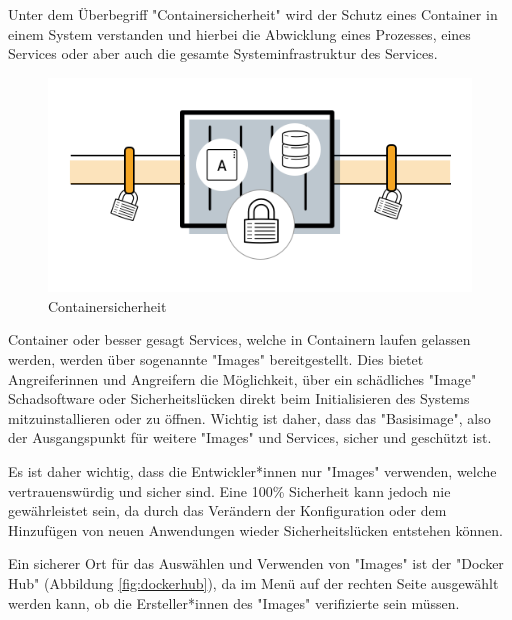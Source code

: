 
Unter dem Überbegriff "Containersicherheit" wird der Schutz eines Container in einem System verstanden und hierbei die Abwicklung eines Prozesses, eines Services oder aber auch die gesamte Systeminfrastruktur des Services. \cite{ContainerSecurity}

\begin{figure}[H]
    \centering
    \includegraphics[width=\textwidth]{media/DockerAndContainering/Containersicherheit.png}
    \caption{Containersicherheit \cite{ContainerSecurity}}
\end{figure}


Container oder besser gesagt Services, welche in Containern laufen gelassen werden, werden über sogenannte "Images" bereitgestellt. Dies bietet Angreiferinnen und Angreifern die Möglichkeit, über ein schädliches "Image" Schadsoftware oder Sicherheitslücken direkt beim Initialisieren des Systems mitzuinstallieren oder zu öffnen. Wichtig ist daher, dass das "Basisimage", also der Ausgangspunkt für weitere "Images" und Services, sicher und geschützt ist. \cite{ContainerSecurity}

Es ist daher wichtig, dass die Entwickler*innen nur "Images" verwenden, welche vertrauenswürdig und sicher sind. Eine 100\% Sicherheit kann jedoch nie gewährleistet sein, da durch das Verändern der Konfiguration oder dem Hinzufügen von neuen Anwendungen wieder Sicherheitslücken entstehen können. \cite{ContainerSecurity}

Ein sicherer Ort für das Auswählen und Verwenden von "Images" ist der "Docker Hub" (Abbildung \ref{fig:dockerhub}), da im Menü auf der rechten Seite ausgewählt werden kann, ob die Ersteller*innen des "Images" verifizierte sein müssen. \cite{ContainerSecurity}

